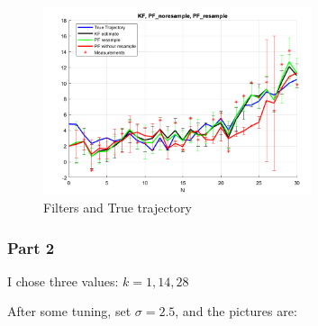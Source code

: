 \begin{figure}[H]
 \centering
 \includegraphics[width=0.7\textwidth]{images/2a.png}
 \caption{Filters and True trajectory}
 \label{2a}
\end{figure}

\subsubsection{Part 2}
I chose three values: $ k=1, 14, 28 $

After some tuning, set $ \sigma = 2.5 $, and the pictures are:


